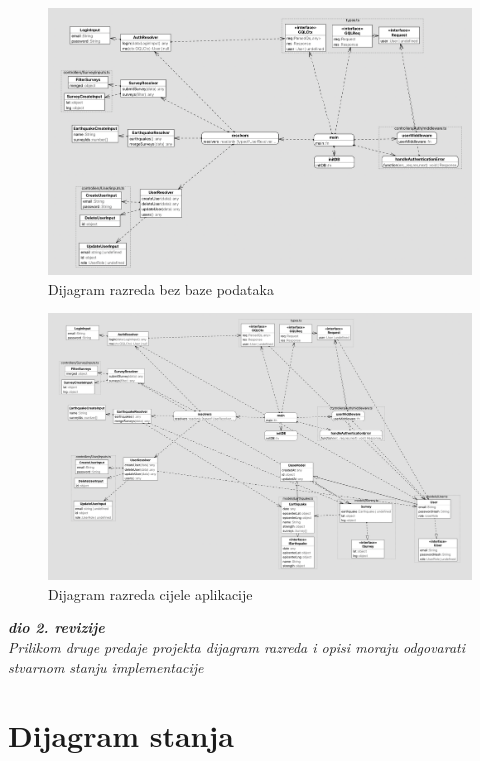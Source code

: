 			\begin{figure}[H]
				\includegraphics[width=\textwidth]{slike/classdiagram_no_db.png} 
				\caption{Dijagram razreda bez baze podataka}
				\label{fig:uml_no_db} 
			\end{figure}

			\begin{figure}[H]
				\includegraphics[width=\textwidth]{slike/classDiagram.png} 
				\caption{Dijagram razreda cijele aplikacije}
				\label{fig:uml} 
			\end{figure}

			\textbf{\textit{dio 2. revizije}}\\			
			
			\textit{Prilikom druge predaje projekta dijagram razreda i opisi moraju odgovarati stvarnom stanju implementacije}
			
			
			
			
			\eject
		
		\section{Dijagram stanja}

